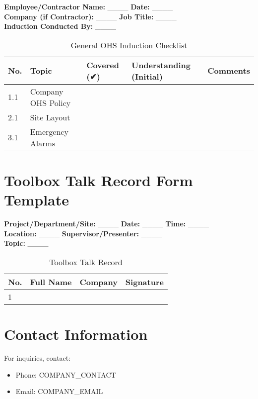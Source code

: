 \documentclass[12pt]{article}
\begin{document}
\textbf{Employee/Contractor Name:} \_\_\_\_ \textbf{Date:} \_\_\_\_\\
\textbf{Company (if Contractor):} \_\_\_\_ \textbf{Job Title:} \_\_\_\_\\
\textbf{Induction Conducted By:} \_\_\_\_

\begin{table}[h]
    \centering
    \begin{tabular}{p{1cm}p{4cm}p{2cm}p{2cm}p{3cm}}
        \toprule
        \textbf{No.} & \textbf{Topic} & \textbf{Covered (✔)} & \textbf{Understanding (Initial)} & \textbf{Comments} \\
        \midrule
        1.1 & Company OHS Policy & & & \\
        2.1 & Site Layout & & & \\
        3.1 & Emergency Alarms & & & \\
        \bottomrule
    \end{tabular}
    \caption{General OHS Induction Checklist}
\end{table}

\section{Toolbox Talk Record Form Template}

\textbf{Project/Department/Site:} \_\_\_\_ \textbf{Date:} \_\_\_\_ \textbf{Time:} \_\_\_\_\\
\textbf{Location:} \_\_\_\_ \textbf{Supervisor/Presenter:} \_\_\_\_\\
\textbf{Topic:} \_\_\_\_

\begin{table}[h]
    \centering
    \begin{tabular}{p{1cm}p{3cm}p{3cm}p{3cm}}
        \toprule
        \textbf{No.} & \textbf{Full Name} & \textbf{Company} & \textbf{Signature} \\
        \midrule
        1 & & & \\
        \bottomrule
    \end{tabular}
    \caption{Toolbox Talk Record}
\end{table}

\section{Contact Information}
For inquiries, contact:
\begin{itemize}
    \item Phone: {{COMPANY_CONTACT}}
    \item Email: {{COMPANY_EMAIL}}
\end{itemize}
\end{document}
